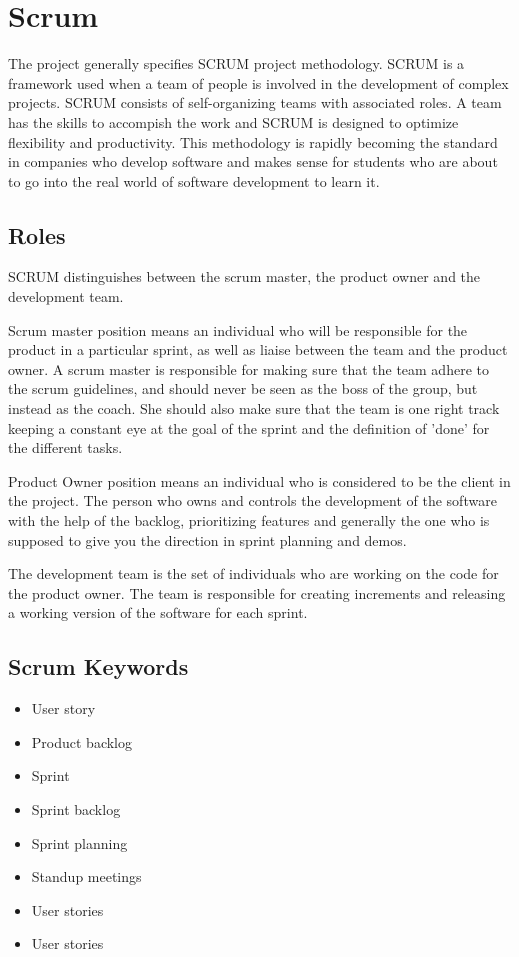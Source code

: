 \section{Scrum}
The project generally specifies SCRUM project methodology. SCRUM is a framework used when a team of people is involved in the development of complex projects. SCRUM consists of self-organizing teams with associated roles. A team has the skills to accompish the work and SCRUM is designed to optimize flexibility and productivity. This methodology is rapidly becoming the standard in companies who develop software and makes sense for students who are about to go into the real world of software development to learn it. 

\subsection{Roles}

SCRUM distinguishes between the scrum master, the product owner and the development team.

Scrum master position means an individual who will be responsible for the product in a
particular sprint, as well as liaise between the team and the product owner.
A scrum master is responsible for making sure that the team adhere to the scrum guidelines,
and should never be seen as the boss of the group, but instead as the coach.
She should also make sure that the team is one right track keeping a constant eye at the goal
of the sprint and the definition of 'done' for the different tasks.

Product Owner position means an individual who is considered to be the client in the project.
The person who owns and controls the development of the software with the help of the backlog,
prioritizing features and generally the one who is supposed to give you the direction in sprint planning and demos.

The development team is the set of individuals who are working on the code for the product owner.
The team is responsible for creating increments and releasing a working version of the software
for each sprint.

\subsection{Scrum Keywords}
\begin{itemize}
\item{User story}
\item{Product backlog}
\item{Sprint}
\item{Sprint backlog}
\item{Sprint planning}
\item{Standup meetings}
\item{User stories}
\item{User stories}

\end{itemize}
